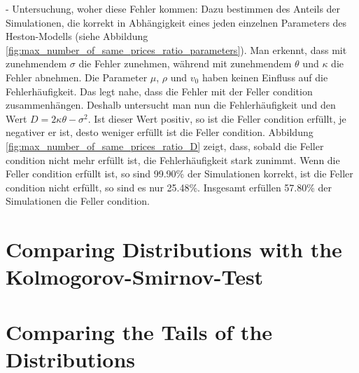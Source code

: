 - Untersuchung, woher diese Fehler kommen: Dazu bestimmen des Anteils der Simulationen, die korrekt in Abhängigkeit eines jeden einzelnen Parameters des Heston-Modells (siehe Abbildung \ref{fig:max_number_of_same_prices_ratio_parameters}). Man erkennt, dass mit zunehmendem $\sigma$ die Fehler zunehmen, während mit zunehmendem $\theta$ und $\kappa$ die Fehler abnehmen. Die Parameter $\mu$, $\rho$ und $v_0$ haben keinen Einfluss auf die Fehlerhäufigkeit. Das legt nahe, dass die Fehler mit der Feller condition zusammenhängen. Deshalb untersucht man nun die Fehlerhäufigkeit und den Wert $D = 2\kappa\theta - \sigma^2$. Ist dieser Wert positiv, so ist die Feller condition erfüllt, je negativer er ist, desto weniger erfüllt ist die Feller condition. Abbildung \ref{fig:max_number_of_same_prices_ratio_D} zeigt, dass, sobald die Feller condition nicht mehr erfüllt ist, die Fehlerhäufigkeit stark zunimmt. Wenn die Feller condition erfüllt ist, so sind 99.90\% der Simulationen korrekt, ist die Feller condition nicht erfüllt, so sind es nur 25.48\%. Insgesamt erfüllen 57.80\% der Simulationen die Feller condition.

\section{Comparing Distributions with the Kolmogorov-Smirnov-Test}

\section{Comparing the Tails of the Distributions}